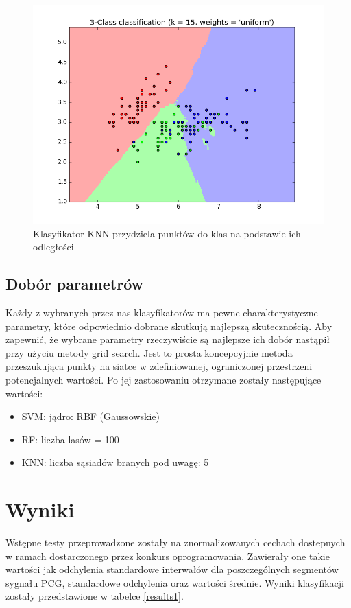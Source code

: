 \documentclass[a4paper]{report}
\begin{document}
\begin{figure}[!htp]
	\centering
	\includegraphics[scale=0.5]{knn.png}
	\caption{Klasyfikator KNN przydziela punktów do klas na podstawie ich odległości}
	\label{knnfigure}
\end{figure}

\subsection{Dobór parametrów}
Każdy z wybranych przez nas klasyfikatorów ma pewne charakterystyczne parametry, które odpowiednio dobrane skutkują najlepszą skutecznością. Aby zapewnić, że wybrane parametry rzeczywiście są najlepsze ich dobór nastąpił przy użyciu metody grid search. Jest to prosta koncepcyjnie metoda przeszukująca punkty na siatce w zdefiniowanej, ograniczonej przestrzeni potencjalnych wartości. Po jej zastosowaniu otrzymane zostały następujące wartości:
\begin{itemize}
	\item SVM: jądro: RBF (Gaussowskie)
	\item RF: liczba lasów = 100 
	\item KNN: liczba sąsiadów branych pod uwagę: 5
\end{itemize}

\section{Wyniki}
Wstępne testy przeprowadzone zostały na znormalizowanych cechach dostepnych w ramach dostarczonego przez konkurs oprogramowania. Zawierały one takie wartości jak odchylenia standardowe interwałów dla poszczególnych segmentów sygnału PCG, standardowe odchylenia oraz wartości średnie. Wyniki klasyfikacji zostały przedstawione w tabelce \ref{results1}. \\
\end{document}
